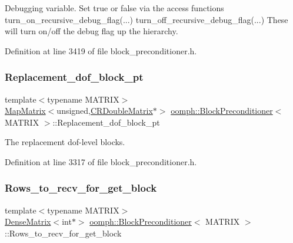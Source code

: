 Debugging variable. Set true or false via the access functions turn\+\_\+on\+\_\+recursive\+\_\+debug\+\_\+flag(...) turn\+\_\+off\+\_\+recursive\+\_\+debug\+\_\+flag(...) These will turn on/off the debug flag up the hierarchy. 



Definition at line 3419 of file block\+\_\+preconditioner.\+h.

\mbox{\label{classoomph_1_1BlockPreconditioner_a6816cfc4c9d74a39aca7401f751bb235}} 
\subsubsection{\texorpdfstring{Replacement\+\_\+dof\+\_\+block\+\_\+pt}{Replacement\_dof\_block\_pt}}
{\footnotesize\ttfamily template$<$typename M\+A\+T\+R\+IX$>$ \\
\hyperlink{classoomph_1_1MapMatrix}{Map\+Matrix}$<$unsigned,\hyperlink{classoomph_1_1CRDoubleMatrix}{C\+R\+Double\+Matrix}$\ast$$>$ \hyperlink{classoomph_1_1BlockPreconditioner}{oomph\+::\+Block\+Preconditioner}$<$ M\+A\+T\+R\+IX $>$\+::Replacement\+\_\+dof\+\_\+block\+\_\+pt\hspace{0.3cm}{\ttfamily [protected]}}



The replacement dof-\/level blocks. 



Definition at line 3317 of file block\+\_\+preconditioner.\+h.

\mbox{\label{classoomph_1_1BlockPreconditioner_a37d5573e5a7c9fba43f4364458e9075c}} 
\subsubsection{\texorpdfstring{Rows\+\_\+to\+\_\+recv\+\_\+for\+\_\+get\+\_\+block}{Rows\_to\_recv\_for\_get\_block}}
{\footnotesize\ttfamily template$<$typename M\+A\+T\+R\+IX$>$ \\
\hyperlink{classoomph_1_1DenseMatrix}{Dense\+Matrix}$<$int$\ast$$>$ \hyperlink{classoomph_1_1BlockPreconditioner}{oomph\+::\+Block\+Preconditioner}$<$ M\+A\+T\+R\+IX $>$\+::Rows\+\_\+to\+\_\+recv\+\_\+for\+\_\+get\+\_\+block\hspace{0.3cm}{\ttfamily [private]}}



